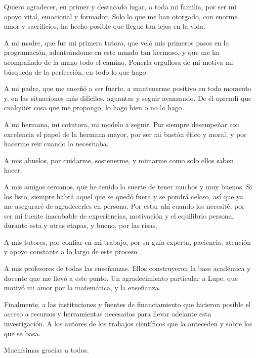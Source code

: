 \begin{acknowledgements}
Quiero agradecer, en primer y destacado lugar, a toda mi familia, por ser mi apoyo vital, emocional y formador. Solo lo que me han otorgado, con enorme amor y sacrificios, ha hecho posible que llegue tan lejos en la vida.

A mi madre, que fue mi primera tutora, que veló mis primeros pasos en la programación, adentrándome en este mundo tan hermoso, y que me ha acompañado de la mano todo el camino. Ponerla orgullosa de mí motiva mi búsqueda de la perfección, en todo lo que hago.

A mi padre, que me enseñó a ser fuerte, a mantenerme positivo en todo momento y, en las situaciones más difíciles, aguantar y seguir avanzando. De él aprendí que cualquier cosa que me propongo, lo hago bien o no lo hago.

A mi hermana, mi cotutora, mi modelo a seguir. Por siempre desempeñar con excelencia el papel de la hermana mayor, por ser mi bastón ético y moral, y por hacerme reir cuando lo necesitaba.

A mis abuelos, por cuidarme, sostenerme, y mimarme como solo ellos saben hacer.

A mis amigos cercanos, que he tenido la suerte de tener muchos y muy buenos. Si los listo, siempre habrá aquel que se quedó fuera y se pondrá celoso, así que ya me aseguraré de agradecerles en persona. Por estar ahí cuando los necesité, por ser mi fuente inacabable de experiencias, motivación y el equilibrio personal durante esta y otras etapas, y bueno, por las risas.

A mis tutores, por confiar en mi trabajo, por su guía experta, paciencia, atención y apoyo constante a lo largo de este proceso.

A mis profesores de todas las enseñanzas. Ellos construyeron la base académica y docente que me llevó a este punto. Un agradecimiento particular a Lupe, que motivó mi amor por la matemática, y la enseñanza.

Finalmente, a las instituciones y fuentes de financiamiento que hicieron posible el acceso a recursos y herramientas necesarios para llevar adelante esta investigación. A los autores de los trabajos científicos que la anteceden y sobre los que se basa.

Muchísimas gracias a todos.

\end{acknowledgements}